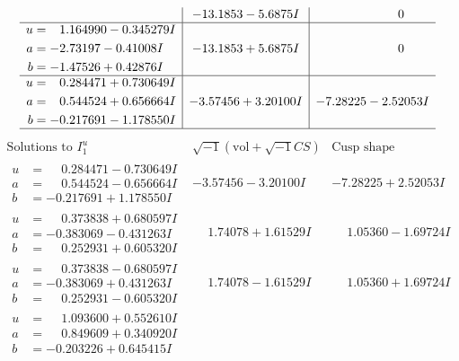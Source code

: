 \documentclass[1p]{elsarticle_modified}
\theoremstyle{definition}
\newcommand{\I}{\sqrt{-1}}
\begin{document}
$$\begin{array}{c|c|c}
 & -13.1853 - 5.6875 I & \phantom{-0.000000 } 0 \\ \hline\begin{aligned}
u &= \phantom{-}1.164990 - 0.345279 I \\
a &= -2.73197 - 0.41008 I \\
b &= -1.47526 + 0.42876 I\end{aligned}
 & -13.1853 + 5.6875 I & \phantom{-0.000000 } 0 \\ \hline\begin{aligned}
u &= \phantom{-}0.284471 + 0.730649 I \\
a &= \phantom{-}0.544524 + 0.656664 I \\
b &= -0.217691 - 1.178550 I\end{aligned}
 & -3.57456 + 3.20100 I & -7.28225 - 2.52053 I\\
 \hline 
 \end{array}$$\newpage$$\begin{array}{c|c|c}  
\text{Solutions to }I^u_{1}& \I (\text{vol} + \sqrt{-1}CS) & \text{Cusp shape}\\
 \hline 
\begin{aligned}
u &= \phantom{-}0.284471 - 0.730649 I \\
a &= \phantom{-}0.544524 - 0.656664 I \\
b &= -0.217691 + 1.178550 I\end{aligned}
 & -3.57456 - 3.20100 I & -7.28225 + 2.52053 I \\ \hline\begin{aligned}
u &= \phantom{-}0.373838 + 0.680597 I \\
a &= -0.383069 - 0.431263 I \\
b &= \phantom{-}0.252931 + 0.605320 I\end{aligned}
 & \phantom{-}1.74078 + 1.61529 I & \phantom{-}1.05360 - 1.69724 I \\ \hline\begin{aligned}
u &= \phantom{-}0.373838 - 0.680597 I \\
a &= -0.383069 + 0.431263 I \\
b &= \phantom{-}0.252931 - 0.605320 I\end{aligned}
 & \phantom{-}1.74078 - 1.61529 I & \phantom{-}1.05360 + 1.69724 I \\ \hline\begin{aligned}
u &= \phantom{-}1.093600 + 0.552610 I \\
a &= \phantom{-}0.849609 + 0.340920 I \\
b &= -0.203226 + 0.645415 I\end{aligned}

\end{array}$$
\end{document}
